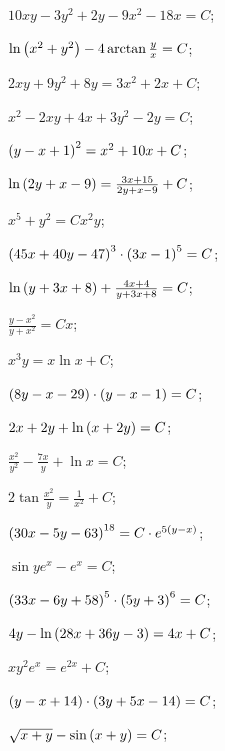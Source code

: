 \begin{enumsols}
		\item \( 10xy - 3y^2 + 2y - 9x^2 - 18x = C \); \sfill %
		\item \( \ln\left( x^2 + y^2 \right) - 4 \arctan{\frac{y}{x}} = C \); \sfill %
		\item \( 2xy + 9y^2 + 8y = 3x^2 + 2x + C \); \sfill %
		\item \( x^2 - 2xy + 4x + 3y^2 - 2y = C \); \sfill %
		\item \( \left( y - x + 1 \right)^2 = x^2 + 10x + C \); \sfill %
		\item \( \ln\left( 2y + x - 9 \right) = \frac{3x + 15}{2y + x - 9} + C \); \sfill %
		\item \( x^5 + y^2 = C x^2 y \); \sfill %
		\item \( \left( 45x + 40y - 47 \right)^{3} \cdot \left( 3x - 1 \right)^{5} = C \); \sfill %
		\item \( \ln\left( y + 3x + 8 \right) + \frac{ 4x + 4 }{y + 3x + 8} = C \); \sfill %
		\item \( \frac{y - x^2}{y + x^2} = Cx \); \sfill %
		\item \( x^3 y = x \ln{x} + C \); \sfill %
		\item \( \left( 8y - x - 29 \right) \cdot \left( y - x - 1 \right) = C \); \sfill %
		\item \( 2x + 2y + \ln\left( x + 2y \right) = C \); \sfill %
		\item \( \frac{x^2}{y^2} - \frac{7x}{y} + \ln{x} = C \); \sfill %
		\item \( 2 \tan{\frac{x^2}{y}} = \frac{1}{x^2} + C \); \sfill %
		\item \( \left( 30x - 5y - 63 \right)^{18} = C \cdot e^{5\left( y - x \right)} \); \sfill %
		\item \( \sin{ye^{x}} - e^{x} = C \); \sfill %
		\item \( \left( 33x - 6y + 58 \right)^{5} \cdot \left( 5y + 3 \right)^{6} = C \); \sfill %
		\item \( 4y - \ln\left( 28x + 36y - 3 \right) = 4x + C \); \sfill %
		\item \( xy^2 e^{x} = e^{2x} + C \); \sfill %
		\item \( \left( y - x + 14 \right) \cdot \left( 3y + 5x - 14 \right) = C \); \sfill %
		\item \( \sqrt{x + y} - \sin{ \left( x + y \right) } = C \); \sfill %


\end{enumsols}
